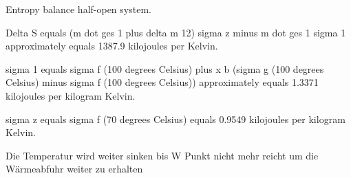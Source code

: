 Entropy balance half-open system.

Delta S equals (m dot ges 1 plus delta m 12) sigma z minus m dot ges 1 sigma 1 approximately equals 1387.9 kilojoules per Kelvin.

sigma 1 equals sigma f (100 degrees Celsius) plus x b (sigma g (100 degrees Celsius) minus sigma f (100 degrees Celsius)) approximately equals 1.3371 kilojoules per kilogram Kelvin.

sigma z equals sigma f (70 degrees Celsius) equals 0.9549 kilojoules per kilogram Kelvin.

Die Temperatur wird weiter sinken bis W Punkt nicht mehr reicht um die Wärmeabfuhr weiter zu erhalten